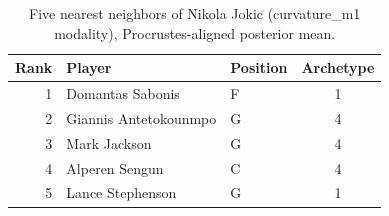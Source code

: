 \begin{table}[htbp]
  \centering\small
  \begin{tabular}{rllc}
    \toprule
    Rank & Player & Position & Archetype \\
    \midrule
    1 & Domantas Sabonis & F & 1 \\
    2 & Giannis Antetokounmpo & G & 4 \\
    3 & Mark Jackson & G & 4 \\
    4 & Alperen Sengun & C & 4 \\
    5 & Lance Stephenson & G & 1 \\
    \bottomrule
  \end{tabular}
  \caption{Five nearest neighbors of Nikola Jokic (curvature_m1 modality), Procrustes-aligned posterior mean.}
  \label{tab:Nikola_Jokic_neighbors_curvature_m1}
\end{table}

